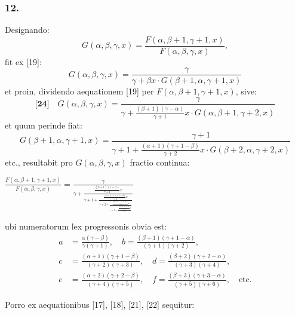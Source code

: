 \documentclass[12pt,a4paper]{article}
\newcommand{\1}{\ensuremath{\mathrlap{\,|\,}}} %
\begin{document}
\subsubsection*{12.}

Designando:
\[G(\alpha, \beta, \gamma, x) = \frac{F(\alpha, \beta+1, \gamma+1, x)}{F(\alpha, \beta, \gamma, x)},\]
fit ex [19]:
\[G(\alpha, \beta, \gamma, x) = \frac{\gamma}{\gamma + \beta x \cdot G(\beta+1, \alpha, \gamma+1, x)}\]
et proin, dividendo aequationem [19] per $F(\alpha, \beta+1, \gamma+1, x)$, sive:
\[\textbf{[24]} \quad G(\alpha, \beta, \gamma, x) = \frac{\gamma}{\gamma + \frac{(\beta+1)(\gamma-\alpha)}{\gamma+1}x \cdot G(\alpha, \beta+1, \gamma+2, x)}\]
et quum perinde fiat:
\[G(\beta+1, \alpha, \gamma+1, x) = \frac{\gamma+1}{\gamma+1 + \frac{(\alpha+1)(\gamma+1-\beta)}{\gamma+2}x \cdot G(\beta+2, \alpha, \gamma+2, x)}\]
etc., resultabit pro $G(\alpha, \beta, \gamma, x)$ fractio continua:

\begin{center}
$\displaystyle
\frac{F(\alpha, \beta+1, \gamma+1, x)}{F(\alpha, \beta, \gamma, x)} =
\frac{\gamma}{\displaystyle\gamma + 
\frac{\frac{(\beta+1)(\gamma-\alpha)}{\gamma+1}x}{\displaystyle\gamma+1 +
\frac{\frac{(\alpha+1)(\gamma+1-\beta)}{\gamma+2}x}{\displaystyle\gamma+2 +
\frac{\frac{(\beta+2)(\gamma+2-\alpha)}{\gamma+3}x}{\displaystyle\gamma+3 +
\frac{\frac{(\alpha+2)(\gamma+2-\beta)}{\gamma+4}x}{\displaystyle\gamma+4 + \cdots}}}}}
$
\end{center}

ubi numeratorum lex progressonis obvia est:
\begin{align*}
a &= \frac{\alpha(\gamma-\beta)}{\gamma(\gamma+1)},\quad
b = \frac{(\beta+1)(\gamma+1-\alpha)}{(\gamma+1)(\gamma+2)},\\
c &= \frac{(\alpha+1)(\gamma+1-\beta)}{(\gamma+2)(\gamma+3)},\quad
d = \frac{(\beta+2)(\gamma+2-\alpha)}{(\gamma+3)(\gamma+4)},\\
e &= \frac{(\alpha+2)(\gamma+2-\beta)}{(\gamma+4)(\gamma+5)},\quad
f = \frac{(\beta+3)(\gamma+3-\alpha)}{(\gamma+5)(\gamma+6)},\quad\text{etc.}
\end{align*}

Porro ex aequationibus [17], [18], [21], [22] sequitur:
\end{document}
